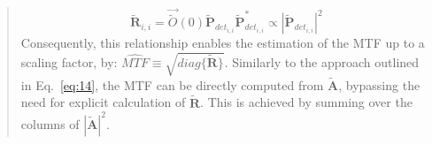 \documentclass[12pt]{article}
\newenvironment{ourresponse}
    {\begin{tcolorbox}[width=\linewidth,breakable,enhanced,colback=gray!5,colframe=responsecolor!50,title=Response,left=5pt,right=5pt]}
    {\end{tcolorbox}}
\begin{document}
\begin{enumerate}[label=\arabic*.]
\begin{ourresponse}
\begin{quote}
            \begin{equation}
            \tilde{\textbf{R}}_{i,i} = \vec{\tilde{O}}(0) {\tilde{\textbf{P}}_{det_{i,i}}}{\tilde{\textbf{P}}^*_{det_{i,i}}} \propto |{\tilde{\textbf{P}}_{det_{i,i}}}|^2
            \label{eq:16}  \tag{S16}
            \end{equation}
            Consequently, this relationship enables the estimation of the MTF up to a scaling factor, by:
            $\widehat{MTF} \equiv \sqrt{diag\{\tilde{\textbf{R}}\}}$. %
            Similarly to the approach outlined in Eq.~\ref{eq:14}, the MTF can be directly computed from $\tilde{\textbf{A}}$, bypassing the need for explicit calculation of $\tilde{\textbf{R}}$. This is achieved by summing over the columns of $|{\tilde{\textbf{A}}}|^2$.
            

\end{quote}
\end{ourresponse}
\end{enumerate}
\end{document}

